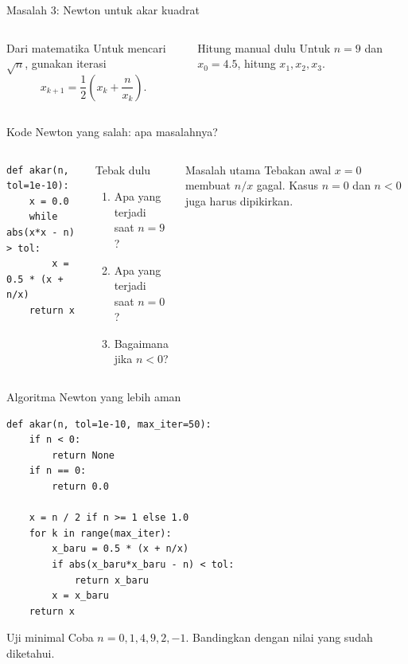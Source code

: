 \documentclass[aspectratio=169,11pt]{beamer}
\begin{document}
\begin{frame}[fragile]{Masalah 3: Newton untuk akar kuadrat}
\begin{columns}[T]
\begin{block}{Dari matematika}
Untuk mencari $\sqrt{n}$, gunakan iterasi
\[
x_{k+1}=\frac12\left(x_k+\frac{n}{x_k}\right).
\]
\end{block}
\begin{block}{Hitung manual dulu}
Untuk $n=9$ dan $x_0=4.5$, hitung $x_1,x_2,x_3$.
\end{block}
\end{columns}
\end{frame}

\begin{frame}[fragile]{Kode Newton yang salah: apa masalahnya?}
\begin{columns}[T]
\begin{lstlisting}
def akar(n, tol=1e-10):
    x = 0.0
    while abs(x*x - n) > tol:
        x = 0.5 * (x + n/x)
    return x
\end{lstlisting}
\begin{block}{Tebak dulu}
\begin{enumerate}\small
  \item Apa yang terjadi saat $n=9$?
  \item Apa yang terjadi saat $n=0$?
  \item Bagaimana jika $n<0$?
\end{enumerate}
\end{block}
\pause
\begin{alertblock}{Masalah utama}
Tebakan awal $x=0$ membuat $n/x$ gagal. Kasus $n=0$ dan $n<0$ juga harus dipikirkan.
\end{alertblock}
\end{columns}
\end{frame}

\begin{frame}[fragile]{Algoritma Newton yang lebih aman}
\begin{lstlisting}
def akar(n, tol=1e-10, max_iter=50):
    if n < 0:
        return None
    if n == 0:
        return 0.0

    x = n / 2 if n >= 1 else 1.0
    for k in range(max_iter):
        x_baru = 0.5 * (x + n/x)
        if abs(x_baru*x_baru - n) < tol:
            return x_baru
        x = x_baru
    return x
\end{lstlisting}
\pause
\begin{block}{Uji minimal}
Coba $n=0,1,4,9,2,-1$. Bandingkan dengan nilai yang sudah diketahui.
\end{block}
\end{frame}
\end{document}
